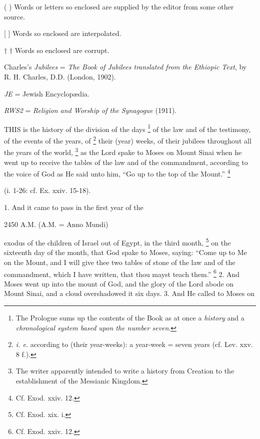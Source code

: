 ( ) Words or letters so enclosed are supplied by the editor from some other source.

[ ] Words so enclosed are interpolated.

† † Words so enclosed are corrupt.

Charles's \emph{Jubilees} = \emph{The Book of Jubilees translated from the Ethiopic Text}, by R. H. Charles, D.D. (London, 1902).

\emph{JE} = Jewish Encyclopædia.

\emph{RWS2} = \emph{Religion and Worship of the Synagogue} (1911).



THIS is the history of the division of the days \footnote{The Prologue sums up the contents of the Book as at once a \emph{history} and a \emph{chronological system based upon the number seven}.} of the law and of the testimony, of the events of the years, of \footnote{\emph{i. e.} according to (their year-weeks): a year-week = seven years (cf. Lev. xxv. 8 f.).} their (year) weeks, of their jubilees throughout all the years of the world, \footnote{The writer apparently intended to write a history from Creation to the establishment of the Messianic Kingdom.} as the Lord spake to Moses on Mount Sinai when he went up to receive the tables of the law and of the commandment, according to the voice of God as He said unto him, ``Go up to the top of the Mount.'' \footnote{Cf. Exod. xxiv. 12.}


(i. 1-26: cf. Ex. xxiv. 15-18).

1. And it came to pass in the first year of the

2450 A.M. (A.M. = Anno Mundi)

exodus of the children of Israel out of Egypt, in the third month, \footnote{Cf. Exod. xix. i.} on the sixteenth day of the month, that God spake to Moses, saying: ``Come up to Me on the Mount, and I will give thee two tables of stone of the law and of the commandment, which I have written, that thou mayst teach them.'' \footnote{Cf. Exod. xxiv. 12.} 2. And Moses went up into the mount of God, and the glory of the Lord abode on Mount Sinai, and a cloud overshadowed it six days. 3. And He called to Moses on

